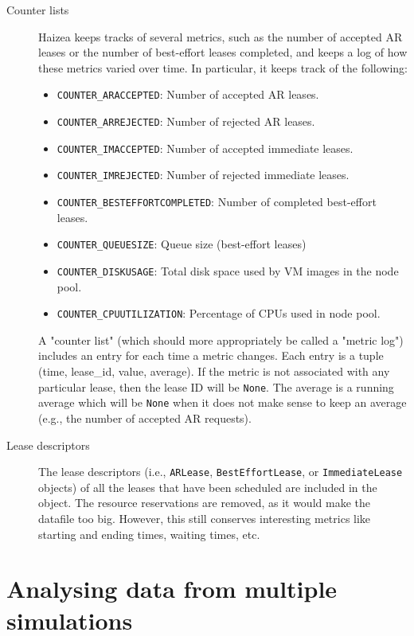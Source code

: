 \begin{description}
 \item[Counter lists] Haizea keeps tracks of several metrics, such as the number of accepted AR leases or the number of best-effort leases completed, and keeps a log of how these metrics varied over time. In particular, it keeps track of the following:
\begin{itemize}

 \item \texttt{COUNTER\_ARACCEPTED}: Number of accepted AR leases.
 \item \texttt{COUNTER\_ARREJECTED}: Number of rejected AR leases.
 \item \texttt{COUNTER\_IMACCEPTED}: Number of accepted immediate leases.
 \item \texttt{COUNTER\_IMREJECTED}: Number of rejected immediate leases.
 \item \texttt{COUNTER\_BESTEFFORTCOMPLETED}: Number of completed best-effort leases.
 \item \texttt{COUNTER\_QUEUESIZE}: Queue size (best-effort leases)
 \item \texttt{COUNTER\_DISKUSAGE}: Total disk space used by VM images in the node pool.
 \item \texttt{COUNTER\_CPUUTILIZATION}: Percentage of CPUs used in node pool.
\end{itemize}
      A "counter list" (which should more appropriately be called a "metric log") includes an entry for each time a metric changes. Each entry is a tuple (time, lease\_id, value, average). If the metric is not associated with any particular lease, then the lease ID will be \texttt{None}. The average is a running average which will be \texttt{None} when it does not make sense to keep an average (e.g., the number of accepted AR requests).
\item[Lease descriptors] The lease descriptors (i.e., \texttt{ARLease}, \texttt{BestEffortLease}, or \texttt{ImmediateLease} objects) of all the leases that have been scheduled are included in the object. The resource reservations are removed, as it would make the datafile too big. However, this still conserves interesting metrics like starting and ending times, waiting times, etc.
\end{description}

\section{Analysing data from multiple simulations}

